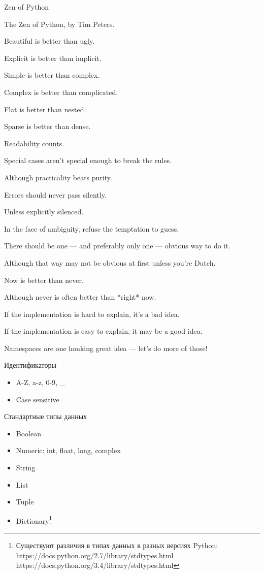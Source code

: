 \documentclass[hyperref={pdftex,unicode}]{beamer}
\begin{document}
\begin{frame}{Zen of Python}
\footnotesize{
The Zen of Python, by Tim Peters.

Beautiful is better than ugly.

Explicit is better than implicit.

Simple is better than complex.

Complex is better than complicated.

Flat is better than nested.

Sparse is better than dense.

Readability counts.

Special cases aren't special enough to break the rules.

Although practicality beats purity.

Errors should never pass silently.

Unless explicitly silenced.

In the face of ambiguity, refuse the temptation to guess.

There should be one --- and preferably only one --- obvious way to do it.

Although that way may not be obvious at first unless you're Dutch.

Now is better than never.

Although never is often better than *right* now.

If the implementation is hard to explain, it's a bad idea.

If the implementation is easy to explain, it may be a good idea.

Namespaces are one honking great idea --- let's do more of those!}
\end{frame}

\begin{frame}{Идентификаторы}
  \begin{itemize}
    \item A-Z, a-z, 0-9, \_
    \item Case sensitive
  \end{itemize}
\end{frame}

\begin{frame}{Стандартные типы данных}
  \begin{itemize}
    \item Boolean
    \item Numeric: int, float, long, complex
    \item String
    \item List
    \item Tuple
    \item Dictionary\footnote[frame]{
        Существуют различия в типах данных в разных версиях Python: \\
        https://docs.python.org/2.7/library/stdtypes.html \\
        https://docs.python.org/3.4/library/stdtypes.html}
  \end{itemize}
\end{frame}
\end{document}
